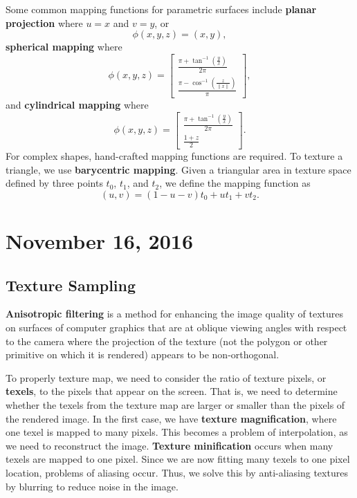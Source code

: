 \documentclass[11pt]{article}
\theoremstyle{plain} %
\theoremstyle{definition}
\theoremstyle{example}
\theoremstyle{remark}
\begin{document}
Some common mapping functions for parametric surfaces include \textbf{planar projection} where $u = x$ and $v = y$, or 
$$\phi(x,y,z) = (x,y),$$
\textbf{spherical mapping} where 
$$\phi(x,y,z) = \begin{bmatrix}\frac{\pi + \tan^{-1}\left(\frac{y}{x}\right)}{2\pi} \\ \frac{\pi - \cos^{-1}\left(\frac{z}{\|x\|}\right)}{\pi}\end{bmatrix},$$
and \textbf{cylindrical mapping} where
$$\phi(x,y,z) = \begin{bmatrix}\frac{\pi + \tan^{-1}\left(\frac{y}{x}\right)}{2\pi} \\ \frac{1 + z}{2}\end{bmatrix}.$$
For complex shapes, hand-crafted mapping functions are required. To texture a triangle, we use \textbf{barycentric mapping}. Given a triangular area in texture space defined by three points $t_0$, $t_1$, and $t_2$, we define the mapping function as 
$$(u,v) = (1-u-v)t_0 + ut_1 + vt_2.$$ 

\section{November 16, 2016}
\subsection{Texture Sampling}

\textbf{Anisotropic filtering} is a method for enhancing the image quality of textures on surfaces of computer graphics that are at oblique viewing angles with respect to the camera where the projection of the texture (not the polygon or other primitive on which it is rendered) appears to be non-orthogonal.

To properly texture map, we need to consider the ratio of texture pixels, or \textbf{texels}, to the pixels that appear on the screen. That is, we need to determine whether the texels from the texture map are larger or smaller than the pixels of the rendered image. In the first case, we have \textbf{texture magnification}, where one texel is mapped to many pixels. This becomes a problem of interpolation, as we need to reconstruct the image. \textbf{Texture minification} occurs when many texels are mapped to one pixel. Since we are now fitting many texels to one pixel location, problems of aliasing occur. Thus, we solve this by anti-aliasing textures by blurring to reduce noise in the image. 
\end{document}
